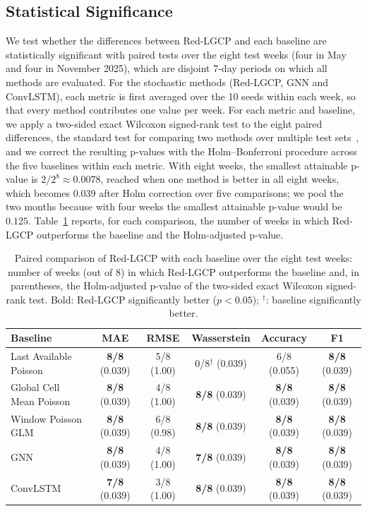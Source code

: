 \subsection{Statistical Significance}
\label{app:significance}

We test whether the differences between Red-LGCP and each baseline are statistically significant with paired tests over the eight test weeks (four in May and four in November 2025), which are disjoint 7-day periods on which all methods are evaluated. For the stochastic methods (Red-LGCP, GNN and ConvLSTM), each metric is first averaged over the 10 seeds within each week, so that every method contributes one value per week. For each metric and baseline, we apply a two-sided exact Wilcoxon signed-rank test to the eight paired differences, the standard test for comparing two methods over multiple test sets~\citep{demsar2006statistical}, and we correct the resulting p-values with the Holm--Bonferroni procedure across the five baselines within each metric. With eight weeks, the smallest attainable p-value is $2/2^8\approx0.0078$, reached when one method is better in all eight weeks, which becomes $0.039$ after Holm correction over five comparisons; we pool the two months because with four weeks the smallest attainable p-value would be $0.125$. Table~\ref{tab:significance} reports, for each comparison, the number of weeks in which Red-LGCP outperforms the baseline and the Holm-adjusted p-value.

\begin{table}[t]
\centering
\caption{Paired comparison of Red-LGCP with each baseline over the eight test weeks: number of weeks (out of 8) in which Red-LGCP outperforms the baseline and, in parentheses, the Holm-adjusted p-value of the two-sided exact Wilcoxon signed-rank test. Bold: Red-LGCP significantly better ($p<0.05$); $^\dagger$: baseline significantly better.}
\label{tab:significance}
\small
\setlength{\tabcolsep}{4pt}
\begin{tabular}{lccccc}
\toprule
Baseline & MAE & RMSE & Wasserstein & Accuracy & F1 \\
\midrule
Last Available Poisson & \textbf{8/8} (0.039) & 5/8 (1.00) & 0/8$^\dagger$ (0.039) & 6/8 (0.055) & \textbf{8/8} (0.039) \\
Global Cell Mean Poisson & \textbf{8/8} (0.039) & 4/8 (1.00) & \textbf{8/8} (0.039) & \textbf{8/8} (0.039) & \textbf{8/8} (0.039) \\
Window Poisson GLM & \textbf{8/8} (0.039) & 6/8 (0.98) & \textbf{8/8} (0.039) & \textbf{8/8} (0.039) & \textbf{8/8} (0.039) \\
GNN & \textbf{8/8} (0.039) & 4/8 (1.00) & \textbf{7/8} (0.039) & \textbf{8/8} (0.039) & \textbf{8/8} (0.039) \\
ConvLSTM & \textbf{7/8} (0.039) & 3/8 (1.00) & \textbf{8/8} (0.039) & \textbf{8/8} (0.039) & \textbf{8/8} (0.039) \\
\bottomrule
\end{tabular}
\end{table}

